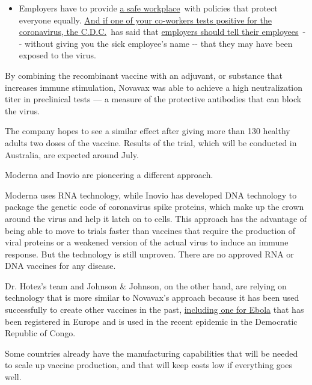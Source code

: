 \begin{itemize}
  \begin{itemize}
  \tightlist
  \item
    Employers have to provide
    \href{https://www.osha.gov/SLTC/covid-19/standards.html}{a safe
    workplace}~with policies that protect everyone equally.
    \href{https://www.nytimes3xbfgragh.onion/article/coronavirus-money-unemployment.html?action=click\&pgtype=Article\&state=default\&region=MAIN_CONTENT_3\&context=storylines_faq}{And
    if one of your co-workers tests positive for the coronavirus, the
    C.D.C.}~has said that
    \href{https://www.cdc.gov/coronavirus/2019-ncov/community/guidance-business-response.html}{employers
    should tell their employees}~-\/- without giving you the sick
    employee's name -\/- that they may have been exposed to the virus.
  \end{itemize}
\end{itemize}

By combining the recombinant vaccine with an adjuvant, or substance that
increases immune stimulation, Novavax was able to achieve a high
neutralization titer in preclinical tests --- a measure of the
protective antibodies that can block the virus.

The company hopes to see a similar effect after giving more than 130
healthy adults two doses of the vaccine. Results of the trial, which
will be conducted in Australia, are expected around July.

Moderna and Inovio are pioneering a different approach.

Moderna uses RNA technology, while Inovio has developed DNA technology
to package the genetic code of coronavirus spike proteins, which make up
the crown around the virus and help it latch on to cells. This approach
has the advantage of being able to move to trials faster than vaccines
that require the production of viral proteins or a weakened version of
the actual virus to induce an immune response. But the technology is
still unproven. There are no approved RNA or DNA vaccines for any
disease.

Dr. Hotez's team and Johnson \& Johnson, on the other hand, are relying
on technology that is more similar to Novavax's approach because it has
been used successfully to create other vaccines in the past,
\href{https://www.nytimes3xbfgragh.onion/2019/07/26/health/ebola-africa.html}{including
one for Ebola} that has been registered in Europe and is used in the
recent epidemic in the Democratic Republic of Congo.

Some countries already have the manufacturing capabilities that will be
needed to scale up vaccine production, and that will keep costs low if
everything goes well.

